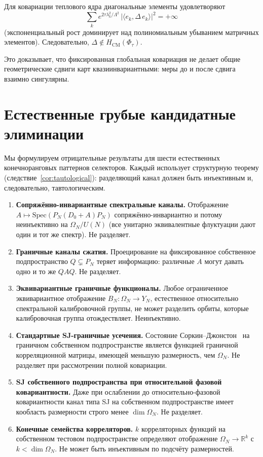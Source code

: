 \documentclass[12pt,a4paper]{article}
\theoremstyle{plain}
\theoremstyle{definition}
\theoremstyle{remark}
\newcommand{\R}{\mathbb{R}}
\newcommand{\Lam}{\Lambda}
\begin{document}
Для ковариации теплового ядра диагональные элементы удовлетворяют
\[
  \sum_k e^{2\tau\lambda_k^2/\Lam^2}\,
  |\langle e_k, \Delta\,e_k\rangle|^2 = +\infty
\]
(экспоненциальный рост доминирует над полиномиальным убыванием
матричных элементов).  Следовательно,
$\Delta \notin H_{\mathrm{CM}}(\Phi_\tau)$.

Это доказывает, что фиксированная глобальная ковариация не делает
общие геометрические сдвиги карт квазиинвариантными: меры до и
после сдвига взаимно сингулярны.


\section{Естественные грубые кандидатные элиминации}
\label{app:candidates}

Мы формулируем отрицательные результаты для шести естественных
конечноранговых паттернов селекторов.  Каждый использует структурную
теорему (следствие~\ref{cor:tautological}): разделяющий канал должен
быть инъективным и, следовательно, тавтологическим.

\begin{enumerate}[leftmargin=2em]
  \item \textbf{Сопряжённо-инвариантные спектральные каналы.}\quad
    Отображение $A \mapsto \mathrm{Spec}(P_N(D_0+A)P_N)$
    сопряжённо-инвариантно и потому неинъективно на
    $\Omega_N/U(N)$ (все унитарно эквивалентные
    флуктуации дают один и тот же спектр).  Не разделяет.

  \item \textbf{Граничные каналы сжатия.}\quad
    Проецирование на фиксированное собственное подпространство
    $Q \subsetneq P_N$ теряет информацию: различные $A$ могут давать
    одно и то же $QAQ$.  Не разделяет.

  \item \textbf{Эквивариантные граничные функционалы.}\quad
    Любое ограниченное эквивариантное отображение
    $B_N\colon \Omega_N \to Y_N$, естественное относительно
    спектральной калибровочной группы, не может разделить орбиты,
    которые калибровочная группа отождествляет.  Неинъективно.

  \item \textbf{Стандартные SJ-граничные усечения.}\quad
    Состояние Соркин--Джонстон~\cite{AAS:2012} на граничном
    собственном подпространстве является функцией граничной
    корреляционной матрицы, имеющей меньшую размерность, чем
    $\Omega_N$.  Не разделяет при рассмотрении полной ковариации.

  \item \textbf{SJ собственного подпространства при относительной
    фазовой ковариантности.}\quad
    Даже при ослаблении до относительно-фазовой ковариантности
    канал типа SJ на собственном подпространстве имеет кообласть
    размерности строго менее $\dim\Omega_N$.  Не разделяет.

  \item \textbf{Конечные семейства корреляторов.}\quad
    $k$ корреляторных функций на собственном тестовом подпространстве
    определяют отображение $\Omega_N \to \R^k$ с $k < \dim\Omega_N$.
    Не может быть инъективным по подсчёту размерностей.
\end{enumerate}
\end{document}
